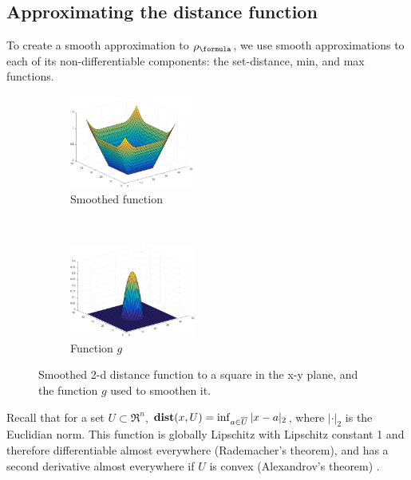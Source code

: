 \subsection{Approximating the distance function}
\label{sec:dist smoothing}
To create a smooth approximation to $\robf$, we use smooth approximations to each of its non-differentiable components: the set-distance, min, and max functions.

\begin{figure}[t!]
	\centering
	\begin{subfigure}[t]{0.25\textwidth}
		\includegraphics[height=1.2in]{figures/smoothDist2d}
		\caption{Smoothed function}
	\end{subfigure}%
	~
	\begin{subfigure}[t]{0.25\textwidth}
		\includegraphics[height=1.2in]{figures/kernelG}
		\caption{Function $g$}
	\end{subfigure}
	\caption{{\small Smoothed 2-d distance function to a square in the x-y plane, and the function $g$ used to smoothen it.}}
	\vspace{-20pt}
	\label{fig:smooth2d}
\end{figure}

Recall that for a set $U \subset \Re^n$, $\mathbf{dist}(x,U) = \inf_{a \in \overline{U}} |x-a|_2$, where $|\cdot|_2$ is the Euclidian norm.
This function is globally Lipschitz with Lipschitz constant 1 and therefore differentiable almost everywhere (Rademacher's theorem), and has a second derivative almost everywhere if $U$ is convex (Alexandrov's theorem) \cite{MakelaN92book}.


